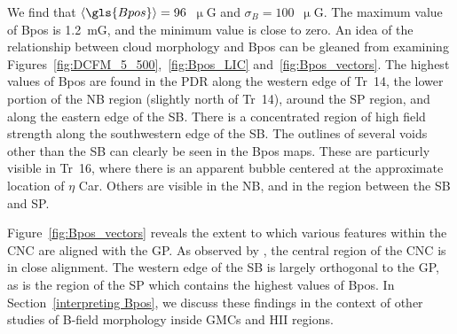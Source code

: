 We find that $\langle \gls{Bpos} \rangle = 96$~$\upmu$G and $\sigma_{B} = 100$~$\upmu$G. The maximum value of \gls{Bpos} is 1.2~mG, and the minimum value is close to zero. An idea of the relationship between cloud morphology and \gls{Bpos} can be gleaned from examining Figures~\ref{fig:DCFM_5_500},~\ref{fig:Bpos_LIC} and~\ref{fig:Bpos_vectors}. The highest values of \gls{Bpos} are found in the PDR along the western edge of Tr~14, the lower portion of the NB region (slightly north of Tr~14), around the SP region, and along the eastern edge of the SB. There is a concentrated region of high field strength along the southwestern edge of the SB. The outlines of several voids other than the SB can clearly be seen in the \gls{Bpos} maps. These are particurly visible in Tr~16, where there is an apparent bubble centered at the approximate location of $\eta$ Car. Others are visible in the NB, and in the region between the SB and SP.

Figure~\ref{fig:Bpos_vectors} reveals the extent to which various features within the CNC are aligned with the GP. As observed by \citet{li2006results}, the central region of the CNC is in close alignment. The western edge of the SB is largely orthogonal to the GP, as is the region of the SP which contains the highest values of \gls{Bpos}. In Section~\ref{interpreting Bpos}, we discuss these findings in the context of other studies of B-field morphology inside GMCs and HII regions.

